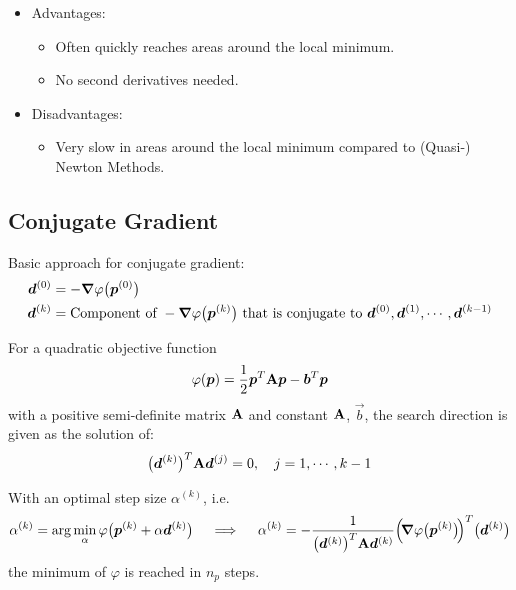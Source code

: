 			\begin{itemize}
				\item Advantages:
					\begin{itemize}
						\item Often quickly reaches areas around the local minimum.
						\item No second derivatives needed.
					\end{itemize}
				\item Disadvantages:
					\begin{itemize}
						\item Very slow in areas around the local minimum compared to (Quasi-) Newton Methods.
					\end{itemize}
			\end{itemize}

		\subsection{Conjugate Gradient}
			Basic approach for conjugate gradient:
			\begin{align*}
				\bm{d}^{(0)} & = -\grad{\varphi}\big(\bm{p}^{(0)}\big)                                                                                                            \\
				\bm{d}^{(k)} & = \text{Component of } -\grad{\varphi}\big(\bm{p}^{(k)}\big) \text{ that is conjugate to } \bm{d}^{(0)}, \bm{d}^{(1)}, \cdots, \bm{d}^{(k - 1)}
			\end{align*}

			For a quadratic objective function
			\begin{align*}
				\varphi(\bm{p}) = \frac{1}{2} \bm{p}^T \bm{\mathrm{A}} \bm{p} - \bm{b}^T \bm{p}
			\end{align*}
			with a positive semi-definite matrix \(\bm{\mathrm{A}}\) and constant \(\bm{\mathrm{A}}\), \(\vec{b}\), the search direction is given as the solution of:
			\begin{align*}
				\big(\bm{d}^{(k)}\big)^T \bm{\mathrm{A}} \bm{d}^{(j)} = 0,\quad j = 1, \cdots, k - 1
			\end{align*}

			With an optimal step size \( \alpha^{(k)} \), i.e.
			\begin{align*}
				\alpha^{(k)} = \arg\min_{\alpha} \varphi\big( \bm{p}^{(k)} + \alpha \bm{d}^{(k)} \big)
				\quad\implies\quad \alpha^{(k)} = -\frac{1}{\big(\bm{d}^{(k)}\big)^T \bm{\mathrm{A}} \bm{d}^{(k)}} \Big(\! \grad{\varphi}\big(\bm{p}^{(k)}\big) \!\Big)^T \big(\bm{d}^{(k)}\big)
			\end{align*}
			the minimum of \(\varphi\) is reached in \(n_p\) steps.

